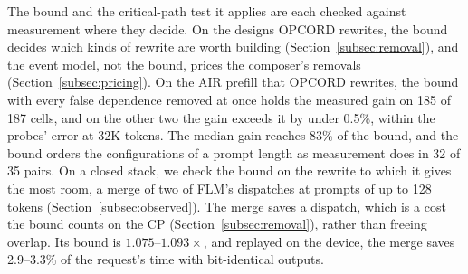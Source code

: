 The bound and the critical-path test it applies are each checked against measurement where they decide.
On the designs OPCORD rewrites, the bound decides which kinds of rewrite are worth building (Section~\ref{subsec:removal}), and the event model, not the bound, prices the composer's removals (Section~\ref{subsec:pricing}).
On the AIR prefill that OPCORD rewrites, the bound with every false dependence removed at once holds the measured gain on 185 of 187 cells, and on the other two the gain exceeds it by under 0.5\%, within the probes' error at 32K tokens.
The median gain reaches 83\% of the bound, and the bound orders the configurations of a prompt length as measurement does in 32 of 35 pairs.
On a closed stack, we check the bound on the rewrite to which it gives the most room, a merge of two of FLM's dispatches at prompts of up to 128 tokens (Section~\ref{subsec:observed}).
The merge saves a dispatch, which is a cost the bound counts on the CP (Section~\ref{subsec:removal}), rather than freeing overlap.
Its bound is $1.075$--$1.093\times$, and replayed on the device, the merge saves 2.9--3.3\% of the request's time with bit-identical outputs.
